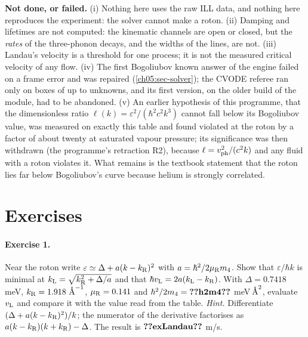\begin{honestbox}
\textbf{Not done, or failed.}
(i) Nothing here uses the raw ILL data, and nothing here reproduces the experiment: the solver cannot make a roton.
(ii) Damping and lifetimes are not computed: the kinematic channels are open or closed, but the \emph{rates} of the three-phonon decays, and the widths of the lines, are not.
(iii) Landau's velocity is a threshold for one process; it is not the measured critical velocity of any flow.
(iv) The first Bogoliubov known answer of the engine failed on a frame error and was repaired (\cref{ch05:sec-solver}); the CVODE referee ran only on boxes of up to  unknowns, and its first version, on the older build of the module, had to be abandoned.
(v) An earlier hypothesis of this programme, that the dimensionless ratio $\ell(k)=\varepsilon^2/(\hbar^2c^2k^3)$ cannot fall below its Bogoliubov value, was measured on exactly this table and found violated at the roton by a factor of about twenty at saturated vapour pressure; its significance was then withdrawn (the programme's retraction R2), because $\ell=v_{\rm ph}^2/(c^2k)$ and any fluid with a roton violates it.
What remains is the textbook statement that the roton lies far below Bogoliubov's curve because helium is strongly correlated.
\end{honestbox}

\section*{Exercises}

\paragraph{Exercise 1.}
Near the roton write $\varepsilon\simeq\Delta+a(k-k_{\rm R})^2$ with $a=\hbar^2/2\mu_{\rm R}m_4$.
Show that $\varepsilon/\hbar k$ is minimal at $k_{\rm L}=\sqrt{k_{\rm R}^2+\Delta/a}$ and that $\hbar v_{\rm L}=2a(k_{\rm L}-k_{\rm R})$.
With $\Delta=0.7418$ meV, $k_{\rm R}=1.918\ \text{\AA}^{-1}$, $\mu_{\rm R}=0.141$ and $\hbar^2/2m_4=\cfiveV{h2m4}$ meV\,$\text{\AA}^2$, evaluate $v_{\rm L}$ and compare it with the value read from the table.
\emph{Hint.} Differentiate $(\Delta+a(k-k_{\rm R})^2)/k$; the numerator of the derivative factorises as $a(k-k_{\rm R})(k+k_{\rm R})-\Delta$.
The result is $\cfiveV{exLandau}$ m/s.

